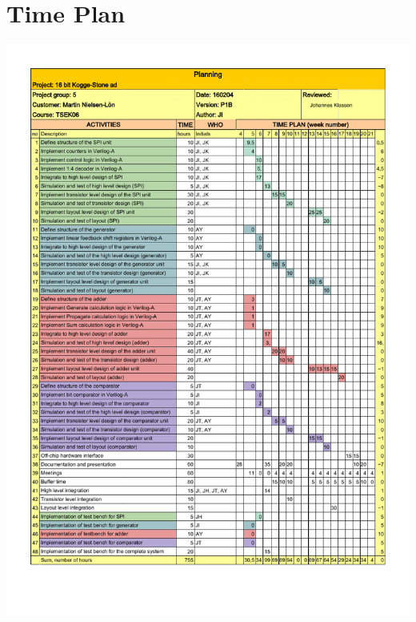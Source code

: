 \section{Time Plan} \label{app:time_plan}

\includegraphics[scale=0.7]{../figures/TSEK06_G05_timeplan_P2A.pdf}
